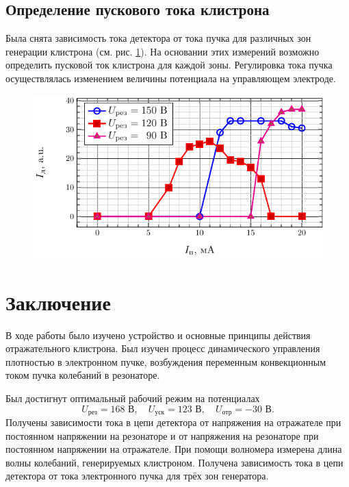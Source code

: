 \documentclass[a4paper,14pt]{extarticle}
\begin{document}
\subsection{Определение пускового тока клистрона}
Была снята зависимость тока детектора от тока пучка для различных зон генерации клистрона (см. рис. \ref{ris:7}).
На основании этих измерений возможно определить пусковой ток клистрона для каждой зоны. Регулировка тока пучка осуществлялась изменением величины потенциала на управляющем электроде.
\begin{figure}[H]
    \centering
    \includegraphics[scale=1.4]{fig2/id_from_ip}
    \caption{}
    \label{ris:7}
\end{figure}



\section*{Заключение}
В ходе работы было изучено устройство и основные принципы действия отражательного клистрона. Был изучен процесс динамического управления плотностью в электронном пучке, возбуждения переменным конвекционным током пучка колебаний в резонаторе.  

Был достигнут оптимальный рабочий режим на потенциалах
\begin{equation}
    U_\text{рез} = 168 \text{ В},\quad
    U_\text{уск} = 123 \text{ В},\quad
    U_\text{отр} = -30 \text{ В}.
\end{equation}
Получены зависимости тока в цепи детектора от напряжения на отражателе при постоянном напряжении на резонаторе и от напряжения на резонаторе при постоянном напряжении на отражателе. При помощи волномера измерена длина волны колебаний, генерируемых клистроном. Получена зависимость тока в цепи детектора от тока электронного пучка для трёх зон генератора. 
\end{document}
